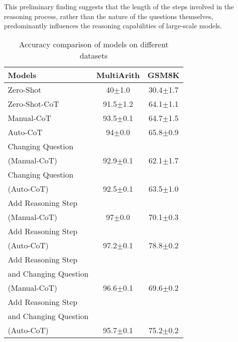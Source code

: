 This preliminary finding suggests that the length of the steps involved in the reasoning process, rather than the nature of the questions themselves, predominantly influences the reasoning capabilities of large-scale models.

\begin{table}[t]
\small
\centering
\caption{Accuracy comparison of models on different datasets}
\begin{tabular}{lcc}
\toprule
Models & MultiArith & GSM8K \\
\midrule
Zero-Shot & 40$\pm$1.0 & 30.4$\pm$1.7 \\
Zero-Shot-CoT & 91.5$\pm$1.2 & 64.1$\pm$1.1 \\
Manual-CoT & 93.5$\pm$0.1 & 64.7$\pm$1.5 \\
Auto-CoT & 94$\pm$0.0 & 65.8$\pm$0.9 \\
\hline %
Changing Question \\(Manual-CoT) & 92.9$\pm$0.1 & 62.1$\pm$1.7 \\
Changing Question \\(Auto-CoT) & 92.5$\pm$0.1 & 63.5$\pm$1.0 \\
\hline
Add Reasoning Step \\(Manual-CoT) & 97$\pm$0.0 & 70.1$\pm$0.3 \\
Add Reasoning Step \\(Auto-CoT) & 97.2$\pm$0.1 & 78.8$\pm$0.2 \\
\hline
Add Reasoning Step \\and Changing Question\\(Manual-CoT) & 96.6$\pm$0.1 & 69.6$\pm$0.2 \\
Add Reasoning Step \\and Changing Question\\(Auto-CoT) & 95.7$\pm$0.1 & 75.2$\pm$0.2 \\
\bottomrule
\end{tabular}
\label{tab:case1}
\end{table}
